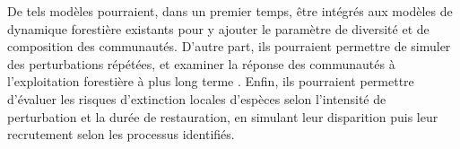 \documentclass[
  11pt,
  french,
  A4paper,
  extrafontsizes,onecolumn,openright
  ]{memoir}
\begin{document}
De tels modèles pourraient, dans un premier temps, être intégrés aux
modèles de dynamique forestière existants pour y ajouter le paramètre de
diversité et de composition des communautés. D'autre part, ils
pourraient permettre de simuler des perturbations répétées, et examiner
la réponse des communautés à l'exploitation forestière à plus long terme
\autocite{Dufour2012}. Enfin, ils pourraient permettre d'évaluer les
risques d'extinction locales d'espèces selon l'intensité de perturbation
et la durée de restauration, en simulant leur disparition puis leur
recrutement selon les processus identifiés.



\backmatter
\SmallMargins

%
\printbibliography










\evenpage
\SmallMargins
\thispagestyle{empty}
\end{document}
